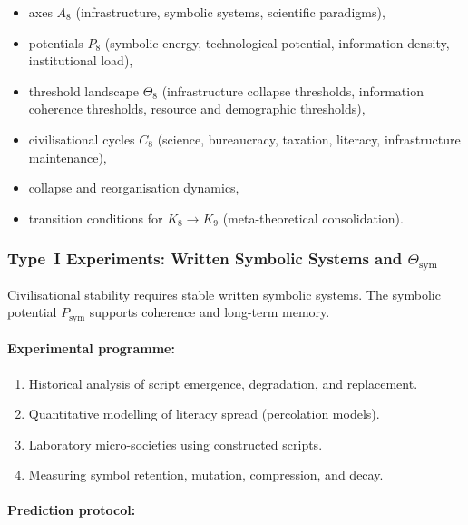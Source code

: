 \begin{itemize}
    \item axes $A_8$ (infrastructure, symbolic systems, scientific paradigms),
    \item potentials $P_8$ (symbolic energy, technological potential, 
          information density, institutional load),
    \item threshold landscape $\Theta_8$ (infrastructure collapse thresholds,
          information coherence thresholds, resource and demographic thresholds),
    \item civilisational cycles $C_8$ (science, bureaucracy, taxation, 
          literacy, infrastructure maintenance),
    \item collapse and reorganisation dynamics,
    \item transition conditions for $K_8 \to K_9$ (meta-theoretical consolidation).
\end{itemize}



\subsubsection{Type~I Experiments: Written Symbolic Systems and $\Theta_{\mathrm{sym}}$}

Civilisational stability requires stable written symbolic systems.
The symbolic potential $P_{\mathrm{sym}}$ supports coherence and long-term memory.

\paragraph{Experimental programme:}

\begin{enumerate}
    \item Historical analysis of script emergence, degradation, and replacement.
    \item Quantitative modelling of literacy spread (percolation models).
    \item Laboratory micro-societies using constructed scripts.
    \item Measuring symbol retention, mutation, compression, and decay.
\end{enumerate}

\paragraph{Prediction protocol:}

